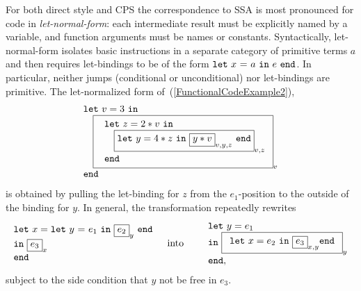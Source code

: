 
For both direct style and CPS the correspondence to SSA is most
pronounced for code in \emph{let-normal-form}: each intermediate
result must be explicitly named by a variable, and function arguments
must be names or constants. Syntactically, let-normal-form isolates
basic instructions in a separate category of primitive terms $a$ and
then requires let-bindings to be of the form $\mathtt{let}\ {x}\ \mathtt{=}\ {a}\ \mathtt{in}\ {e}\ \mathtt{end}$.  In
particular, neither jumps (conditional or unconditional) nor
let-bindings are primitive. The let-normalized form
of~(\ref{FunctionalCodeExample2}),
\begin{equation}
\label{FunctionalCodeExample4}
\begin{array}{l}
\mathtt{let}\ v = 3\ \mathtt{in}\\
\quad 
  {\fbox{
   $\begin{array}[t]{l} 
     \mathtt{let}\ z=2*v \ \mathtt{in}\\
     \quad {\fbox{$\mathtt{let}\ y = 4*z\ \mathtt{in}\ 
                 \fbox{$y*v$}_{v,y,z}\ \mathtt{end}$}_{v,z}}\\
     \mathtt{end}
   \end{array}$}_{v}}\\
\mathtt{end}
\end{array}
\end{equation}
is obtained by pulling the let-binding for $z$ from the
$e_1$-position to the outside of the binding for $y$.  
In general, the transformation repeatedly rewrites
\begin{eqnarray*}
 \begin{array}{l}
   \mathtt{let}\ x = \letin y {e_1} {\fbox{$e_2$}_y}\\
   \mathtt{in}\ {\fbox{$e_3$}_{x}}\\ 
   \mathtt{end}
  \end{array}
& \quad \textrm{into} \quad &
  \begin{array}{l}
    \mathtt{let}\ y = e_1\\
    \mathtt{in}\ \fbox{$\begin{array}{l}
                            \mathtt{let}\ x = {e_2}\ 
                            \mathtt{in}\ {\fbox{$e_3$}_{x,y}}
                            \mathtt{end}
                        \end{array}$}_y\\
    \mathtt{end,}
  \end{array}
\end{eqnarray*}
subject to the side condition that $y$ not be free in $e_3$.


